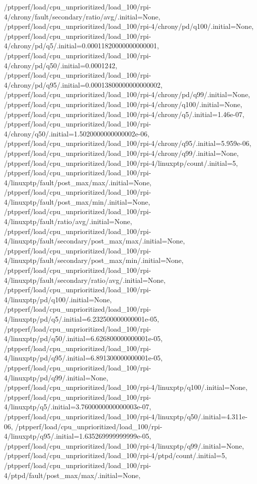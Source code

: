 {    /ptpperf/load/cpu_unprioritized/load_100/rpi-4/chrony/fault/secondary/ratio/avg/.initial=None,
    /ptpperf/load/cpu_unprioritized/load_100/rpi-4/chrony/pd/q100/.initial=None,
    /ptpperf/load/cpu_unprioritized/load_100/rpi-4/chrony/pd/q5/.initial=0.00011820000000000001,
    /ptpperf/load/cpu_unprioritized/load_100/rpi-4/chrony/pd/q50/.initial=0.0001242,
    /ptpperf/load/cpu_unprioritized/load_100/rpi-4/chrony/pd/q95/.initial=0.00013800000000000002,
    /ptpperf/load/cpu_unprioritized/load_100/rpi-4/chrony/pd/q99/.initial=None,
    /ptpperf/load/cpu_unprioritized/load_100/rpi-4/chrony/q100/.initial=None,
    /ptpperf/load/cpu_unprioritized/load_100/rpi-4/chrony/q5/.initial=1.46e-07,
    /ptpperf/load/cpu_unprioritized/load_100/rpi-4/chrony/q50/.initial=1.5020000000000002e-06,
    /ptpperf/load/cpu_unprioritized/load_100/rpi-4/chrony/q95/.initial=5.959e-06,
    /ptpperf/load/cpu_unprioritized/load_100/rpi-4/chrony/q99/.initial=None,
    /ptpperf/load/cpu_unprioritized/load_100/rpi-4/linuxptp/count/.initial=5,
    /ptpperf/load/cpu_unprioritized/load_100/rpi-4/linuxptp/fault/post_max/max/.initial=None,
    /ptpperf/load/cpu_unprioritized/load_100/rpi-4/linuxptp/fault/post_max/min/.initial=None,
    /ptpperf/load/cpu_unprioritized/load_100/rpi-4/linuxptp/fault/ratio/avg/.initial=None,
    /ptpperf/load/cpu_unprioritized/load_100/rpi-4/linuxptp/fault/secondary/post_max/max/.initial=None,
    /ptpperf/load/cpu_unprioritized/load_100/rpi-4/linuxptp/fault/secondary/post_max/min/.initial=None,
    /ptpperf/load/cpu_unprioritized/load_100/rpi-4/linuxptp/fault/secondary/ratio/avg/.initial=None,
    /ptpperf/load/cpu_unprioritized/load_100/rpi-4/linuxptp/pd/q100/.initial=None,
    /ptpperf/load/cpu_unprioritized/load_100/rpi-4/linuxptp/pd/q5/.initial=6.232500000000001e-05,
    /ptpperf/load/cpu_unprioritized/load_100/rpi-4/linuxptp/pd/q50/.initial=6.626800000000001e-05,
    /ptpperf/load/cpu_unprioritized/load_100/rpi-4/linuxptp/pd/q95/.initial=6.891300000000001e-05,
    /ptpperf/load/cpu_unprioritized/load_100/rpi-4/linuxptp/pd/q99/.initial=None,
    /ptpperf/load/cpu_unprioritized/load_100/rpi-4/linuxptp/q100/.initial=None,
    /ptpperf/load/cpu_unprioritized/load_100/rpi-4/linuxptp/q5/.initial=3.7600000000000003e-07,
    /ptpperf/load/cpu_unprioritized/load_100/rpi-4/linuxptp/q50/.initial=4.311e-06,
    /ptpperf/load/cpu_unprioritized/load_100/rpi-4/linuxptp/q95/.initial=1.635269999999999e-05,
    /ptpperf/load/cpu_unprioritized/load_100/rpi-4/linuxptp/q99/.initial=None,
    /ptpperf/load/cpu_unprioritized/load_100/rpi-4/ptpd/count/.initial=5,
    /ptpperf/load/cpu_unprioritized/load_100/rpi-4/ptpd/fault/post_max/max/.initial=None,
}
